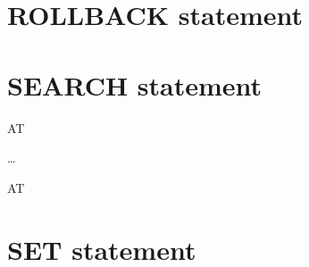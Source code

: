 \begin{0+}
    \imperativestatement \\
     \imperativestatement
\end{0+} \\

\begin{0-1}
\end{0-1}

\section{ROLLBACK statement}


\section{SEARCH statement}

 \identifier
\begin{0-1}
   \identifier
\end{0-1}

\begin{0-1}
  AT  \imperativestatement
\end{0-1}

\begin{1=}
   \condition \imperativestatement
\end{1=} \ldots

\begin{0-1}
\end{0-1}

  \identifier

\begin{0-1}
  AT  \imperativestatement
\end{0-1}

 \expression \imperativestatement

\begin{0-1}
\end{0-1}


\section{SET statement}

 \identifier {}
\begin{1=}
  \identifier \\
  \literal \\
  \arithmeticexpression
\end{1=}

